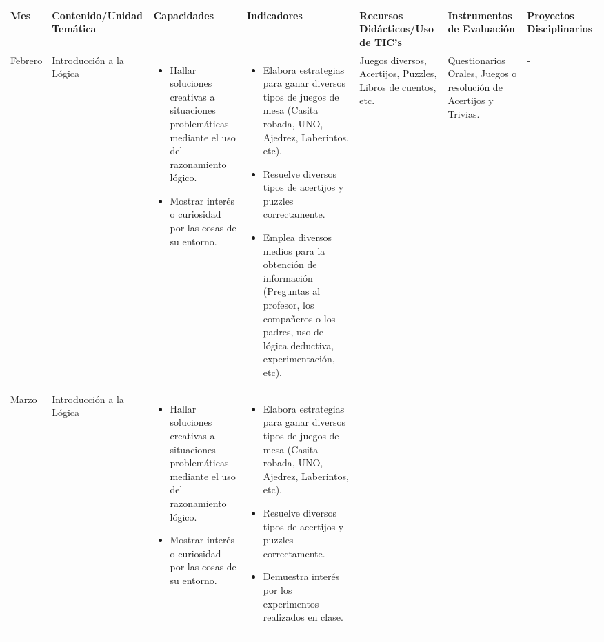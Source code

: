 \documentclass[landscape, a4paper, 10pt]{article}
\newcommand{\smallcellwidth}{0.7in}
\newcommand{\normalcellwidth}{1.2in}
\newcommand{\bigcellwidth}{2.0in}
\begin{document}
	\begin{longtable}{|m{\smallcellwidth}|p{\normalcellwidth}|p{\bigcellwidth}|p{\bigcellwidth}|p{\normalcellwidth}|p{\normalcellwidth}|p{\normalcellwidth}|}
		\hline
		\textbf{Mes} &
		\textbf{Contenido/Unidad Temática} &
		\textbf{Capacidades} &
		\textbf{Indicadores} &
		\textbf{Recursos Didácticos/Uso de TIC's} &
		\textbf{Instrumentos de Evaluación} &
		\textbf{Proyectos Disciplinarios} \\
		\hline
		\endhead
		Febrero &
		Introducción a la Lógica &
		\begin{itemize}
			\item Hallar soluciones creativas a situaciones problemáticas mediante el uso del razonamiento lógico.
			\item Mostrar interés o curiosidad por las cosas de su entorno.
		\end{itemize} &
		\begin{itemize}
			\item Elabora estrategias para ganar diversos tipos de juegos de mesa (Casita robada, UNO, Ajedrez, Laberintos, etc).
			\item Resuelve diversos tipos de acertijos y puzzles correctamente.
			\item Emplea diversos medios para la obtención de información (Preguntas al profesor, los compañeros o los padres, uso de lógica deductiva, experimentación, etc).
 		\end{itemize} &
		Juegos diversos, Acertijos, Puzzles, Libros de cuentos, etc. &
		Questionarios Orales, Juegos o resolución de Acertijos y Trivias. &
		 - \\
		\hline
		Marzo &
		Introducción a la Lógica &
		\begin{itemize}
			\item Hallar soluciones creativas a situaciones problemáticas mediante el uso del razonamiento lógico.
			\item Mostrar interés o curiosidad por las cosas de su entorno.
		\end{itemize} &
		\begin{itemize}
			\item Elabora estrategias para ganar diversos tipos de juegos de mesa (Casita robada, UNO, Ajedrez, Laberintos, etc).
			\item Resuelve diversos tipos de acertijos y puzzles correctamente.
			\item Demuestra interés por los experimentos realizados en clase.

\end{itemize}
\end{longtable}
\end{document}
